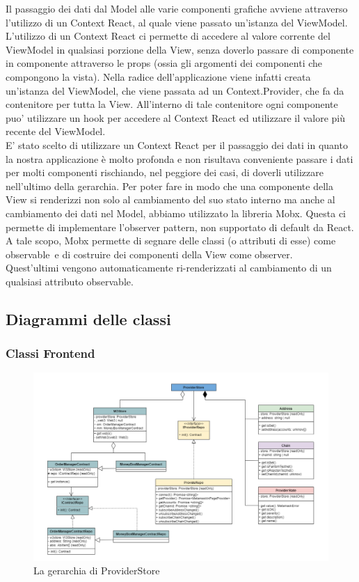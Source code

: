 Il passaggio dei dati dal Model alle varie componenti grafiche avviene attraverso l'utilizzo di un Context
React, al quale viene passato un'istanza del ViewModel. L'utilizzo di un Context React ci permette di
accedere al valore corrente del ViewModel in qualsiasi porzione della View, senza doverlo passare di
componente in componente attraverso le props (ossia gli argomenti dei componenti che compongono la
vista). Nella radice dell'applicazione viene infatti creata un'istanza del ViewModel, che viene passata
ad un Context.Provider, che fa da contenitore per tutta la View. All'interno di tale contenitore ogni
componente puo' utilizzare un hook per accedere al Context React ed utilizzare il valore più recente del ViewModel.
\\
E' stato scelto di utilizzare un Context React per il passaggio dei dati in quanto la nostra applicazione è
molto profonda e non risultava conveniente passare i dati per molti componenti rischiando, nel peggiore
dei casi, di doverli utilizzare nell'ultimo della gerarchia.
Per poter fare in modo che una componente della View si renderizzi non solo al cambiamento del
suo stato interno ma anche al cambiamento dei dati nel Model, abbiamo utilizzato la libreria Mobx\glo.
Questa ci permette di implementare l'observer pattern\glo, non supportato di default da React. A tale
scopo, Mobx permette di segnare delle classi (o attributi di esse) come observable\glo\ e di costruire
dei componenti della View come observer\glo. \\Quest'ultimi vengono automaticamente ri-renderizzati al
cambiamento di un qualsiasi attributo observable.

\subsection{Diagrammi delle classi}

\subsubsection{Classi Frontend}

\begin{figure}[H]
    \centering
    \includegraphics[scale = 0.5]{immagini/providerstore.png}
    \caption{La gerarchia di ProviderStore}
\end{figure}

